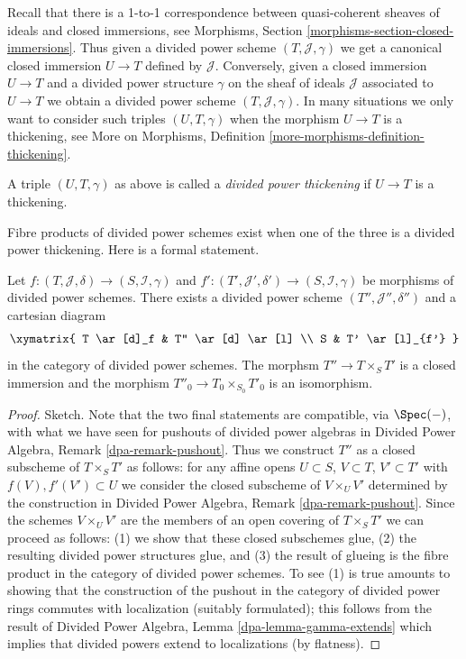 \noindent
Recall that there is a 1-to-1 correspondence between quasi-coherent
sheaves of ideals and closed immersions, see
Morphisms, Section \ref{morphisms-section-closed-immersions}.
Thus given a divided power scheme $(T, \mathcal{J}, \gamma)$ we
get a canonical closed immersion $U \to T$ defined by $\mathcal{J}$.
Conversely, given a closed immersion $U \to T$ and a divided power
structure $\gamma$ on the sheaf of ideals $\mathcal{J}$ associated
to $U \to T$ we obtain a divided power scheme $(T, \mathcal{J}, \gamma)$.
In many situations we only want to consider such triples
$(U, T, \gamma)$ when the morphism $U \to T$ is a thickening, see
More on Morphisms, Definition \ref{more-morphisms-definition-thickening}.

\begin{definition}
\label{definition-divided-power-thickening}
A triple $(U, T, \gamma)$ as above is called a {\it divided power thickening}
if $U \to T$ is a thickening.
\end{definition}

\noindent
Fibre products of divided power schemes exist when one of the
three is a divided power thickening. Here is a formal statement.

\begin{lemma}
\label{lemma-fibre-product}
Let $f : (T, \mathcal{J}, \delta) \to (S, \mathcal{I}, \gamma)$ and
$f' : (T', \mathcal{J}', \delta') \to (S, \mathcal{I}, \gamma)$
be morphisms of divided power schemes. There exists a divided power scheme
$(T'', \mathcal{J}'', \delta'')$ and a cartesian diagram
$$
\xymatrix{
T \ar[d]_f & T'' \ar[d] \ar[l] \\
S & T' \ar[l]_{f'}
}
$$
in the category of divided power schemes. The morphsm
$T'' \to T \times_S T'$ is a closed immersion and the morphism
$T''_0 \to T_0 \times_{S_0} T'_0$ is an isomorphism.
\end{lemma}

\begin{proof}
Sketch. Note that the two final statements are compatible, via $\Spec(-)$,
with what we have seen for pushouts of divided power algebras in
Divided Power Algebra, Remark \ref{dpa-remark-pushout}.
Thus we construct $T''$ as a closed subscheme of $T \times_S T'$
as follows: for any affine opens $U \subset S$, $V \subset T$,
$V' \subset T'$ with $f(V), f'(V') \subset U$ we consider the closed
subscheme of $V \times_U V'$ determined by the construction in
Divided Power Algebra, Remark \ref{dpa-remark-pushout}. Since the
schemes $V \times_U V'$ are the members of an open covering
of $T \times_S T'$ we can proceed as follows: (1) we show that these
closed subschemes glue, (2) the resulting
divided power structures glue, and (3) the result of glueing
is the fibre product in the category of divided power schemes.
To see (1) is true amounts to showing
that the construction of the pushout in the category of
divided power rings commutes with localization (suitably
formulated); this follows from the result of
Divided Power Algebra, Lemma \ref{dpa-lemma-gamma-extends} which implies
that divided powers extend to localizations (by flatness).
\end{proof}

